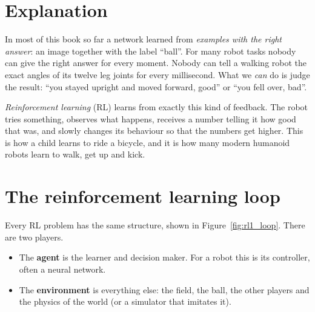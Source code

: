 \label{ch:rl1}

\section*{Explanation}
In most of this book so far a network learned from \emph{examples with the right answer}: an image together with the label ``ball''. For many robot tasks nobody can give the right answer for every moment. Nobody can tell a walking robot the exact angles of its twelve leg joints for every millisecond. What we \emph{can} do is judge the result: ``you stayed upright and moved forward, good'' or ``you fell over, bad''.

\emph{Reinforcement learning} (RL) learns from exactly this kind of feedback. The robot tries something, observes what happens, receives a number telling it how good that was, and slowly changes its behaviour so that the numbers get higher. This is how a child learns to ride a bicycle, and it is how many modern humanoid robots learn to walk, get up and kick.

\section*{The reinforcement learning loop}
Every RL problem has the same structure, shown in Figure~\ref{fig:rl1_loop}. There are two players.

\begin{itemize}[nosep]
  \item The \textbf{agent} is the learner and decision maker. For a robot this is its controller, often a neural network.
  \item The \textbf{environment} is everything else: the field, the ball, the other players and the physics of the world (or a simulator that imitates it).
\end{itemize}

\begin{center}
\label{fig:rl1_loop}
\end{center}

